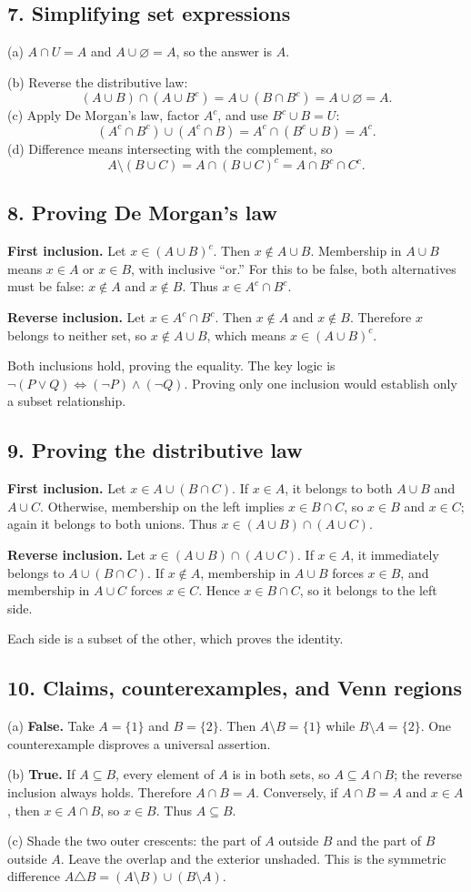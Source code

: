 \documentclass[11pt,letterpaper]{article}
\newcommand{\answer}[2]{\Needspace{2in}\subsection*{#1}#2}
\begin{document}
\answer{7. Simplifying set expressions}{(a) $A\cap U=A$ and $A\cup\varnothing=A$, so the answer is $\boxed{A}$.

(b) Reverse the distributive law:
\[
(A\cup B)\cap(A\cup B^c)=A\cup(B\cap B^c)=A\cup\varnothing=\boxed{A}.
\]
(c) Apply De Morgan's law, factor $A^c$, and use $B^c\cup B=U$:
\[
(A^c\cap B^c)\cup(A^c\cap B)=A^c\cap(B^c\cup B)=\boxed{A^c}.
\]
(d) Difference means intersecting with the complement, so
\[
A\setminus(B\cup C)=A\cap(B\cup C)^c=\boxed{A\cap B^c\cap C^c}.
\]}

\answer{8. Proving De Morgan's law}{\textbf{First inclusion.} Let $x\in(A\cup B)^c$. Then $x\notin A\cup B$. Membership in $A\cup B$ means $x\in A$ or $x\in B$, with inclusive ``or.'' For this to be false, both alternatives must be false: $x\notin A$ and $x\notin B$. Thus $x\in A^c\cap B^c$.

\textbf{Reverse inclusion.} Let $x\in A^c\cap B^c$. Then $x\notin A$ and $x\notin B$. Therefore $x$ belongs to neither set, so $x\notin A\cup B$, which means $x\in(A\cup B)^c$.

Both inclusions hold, proving the equality. The key logic is
$\neg(P\lor Q)\iff(\neg P)\land(\neg Q)$. Proving only one inclusion would establish only a subset relationship.}

\answer{9. Proving the distributive law}{\textbf{First inclusion.} Let $x\in A\cup(B\cap C)$. If $x\in A$, it belongs to both $A\cup B$ and $A\cup C$. Otherwise, membership on the left implies $x\in B\cap C$, so $x\in B$ and $x\in C$; again it belongs to both unions. Thus $x\in(A\cup B)\cap(A\cup C)$.

\textbf{Reverse inclusion.} Let $x\in(A\cup B)\cap(A\cup C)$. If $x\in A$, it immediately belongs to $A\cup(B\cap C)$. If $x\notin A$, membership in $A\cup B$ forces $x\in B$, and membership in $A\cup C$ forces $x\in C$. Hence $x\in B\cap C$, so it belongs to the left side.

Each side is a subset of the other, which proves the identity.}

\answer{10. Claims, counterexamples, and Venn regions}{(a) \textbf{False.} Take $A=\{1\}$ and $B=\{2\}$. Then $A\setminus B=\{1\}$ while $B\setminus A=\{2\}$. One counterexample disproves a universal assertion.

(b) \textbf{True.} If $A\subseteq B$, every element of $A$ is in both sets, so $A\subseteq A\cap B$; the reverse inclusion always holds. Therefore $A\cap B=A$. Conversely, if $A\cap B=A$ and $x\in A$, then $x\in A\cap B$, so $x\in B$. Thus $A\subseteq B$.

(c) Shade the two outer crescents: the part of $A$ outside $B$ and the part of $B$ outside $A$. Leave the overlap and the exterior unshaded. This is the symmetric difference $A\triangle B=(A\setminus B)\cup(B\setminus A)$.}
\end{document}

